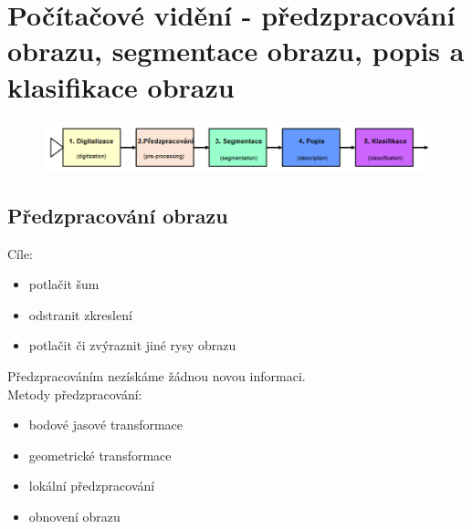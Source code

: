 \section{Počítačové vidění - předzpracování obrazu, segmentace obrazu, popis a klasifikace obrazu}
\begin{figure}[H]
    \includegraphics[scale = 0.4]{images/pc_videni.png}
\end{figure}

\subsection*{Předzpracování obrazu}
Cíle:
\begin{itemize}
    \item potlačit šum
    \item odstranit zkreslení
    \item potlačit či zvýraznit jiné rysy obrazu
\end{itemize}
Předzpracováním nezískáme žádnou novou informaci.\\
Metody předzpracování:
\begin{itemize}
    \item bodové jasové transformace
    \item geometrické transformace
    \item lokální předzpracování
    \item obnovení obrazu
\end{itemize}

